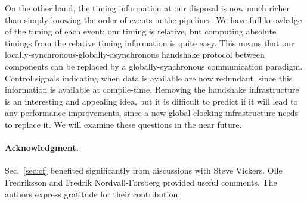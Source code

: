 \documentclass{article}
\begin{document}
On the other hand, the timing information at our disposal is now much richer than simply knowing the order of events in the pipelines. We have full knowledge of the timing of each event; our timing is relative, but computing absolute timings from the relative timing information is quite easy. This means that our locally-synchronous-globally-asynchronous handshake protocol between components can be replaced by a globally-synchronous communication paradigm. Control signals indicating when data is available are now redundant, since this information is available at compile-time. Removing the handshake infrastructure is an interesting and appealing idea, but it is difficult to predict if it will lead to any performance improvements, since a new global clocking infrastructure needs to replace it. We will examine these questions in the near future. 


\paragraph{Acknowledgment.}
Sec.~\ref{sec:cf} benefited significantly from discussions with Steve Vickers. Olle Fredriksson and Fredrik Nordvall-Forsberg provided useful comments. The authors express gratitude for their contribution. 



\end{document}
